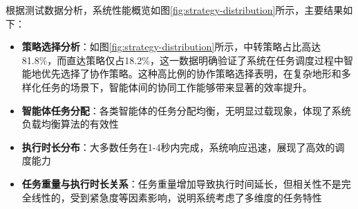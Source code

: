 \documentclass[12pt,a4paper]{article}
\begin{document}
根据测试数据分析，系统性能概览如图\ref{fig:strategy-distribution}所示，主要结果如下：

\begin{itemize}
    \item \textbf{策略选择分析}：如图\ref{fig:strategy-distribution}所示，中转策略占比高达81.8\%，而直达策略仅占18.2\%，这一数据明确验证了系统在任务调度过程中智能地优先选择了协作策略。这种高比例的协作策略选择表明，在复杂地形和多样化任务的场景下，智能体间的协同工作能够带来显著的效率提升。
    \item \textbf{智能体任务分配}：各类智能体的任务分配均衡，无明显过载现象，体现了系统负载均衡算法的有效性
    \item \textbf{执行时长分布}：大多数任务在1-4秒内完成，系统响应迅速，展现了高效的调度能力
    \item \textbf{任务重量与执行时长关系}：任务重量增加导致执行时间延长，但相关性不是完全线性的，受到紧急度等因素影响，说明系统考虑了多维度的任务特性
\end{itemize}
\end{document}
